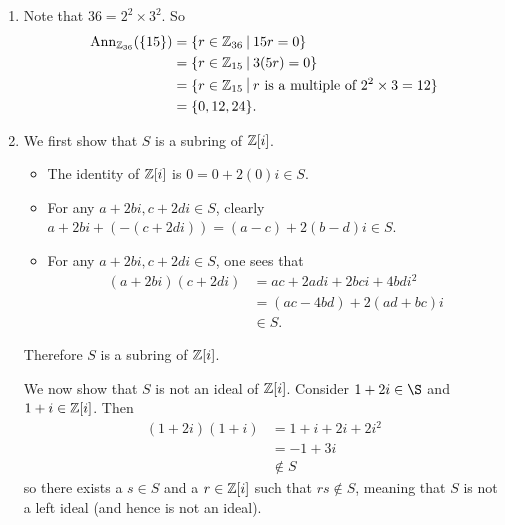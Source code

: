 \begin{enumerate}
    \item Note that $36 = 2^2 \times 3^2$. So
    \begin{align*}
        \Ann{\Z_{36}}{\{15\}} &= \{r \in \Z_{36} \vert 15r = 0\}\\
        &= \{r \in \Z_{15} \vert 3(5r) = 0\}\\
        &= \{r \in \Z_{15} \vert r \text{ is a multiple of }2^2\times3 = 12\}\\
        &= \{0,12,24\}.
    \end{align*}

    \item We first show that $S$ is a subring of $\mathbb{Z}[i]$.
    \begin{itemize}
        \item The identity of $\mathbb{Z}[i]$ is $0 = 0 + 2(0)i \in S$.
        \item For any $a+2bi, c+2di \in S$, clearly $a+2bi + (-(c + 2di)) = (a-c) + 2(b-d)i \in S$.
        \item For any $a+2bi, c+2di \in S$, one sees that
        \begin{align*}
            (a+2bi)(c+2di) &= ac + 2adi + 2bci + 4bdi^2\\
            &= (ac-4bd) + 2(ad+bc)i\\
            &\in S.
        \end{align*}
    \end{itemize}
    Therefore $S$ is a subring of $\mathbb{Z}[i]$.

    We now show that $S$ is not an ideal of $\mathbb{Z}[i]$. Consider $1+2i \in \S$ and $1+i \in \mathbb{Z}[i]$. Then
    \begin{align*}
        (1+2i)(1+i) &= 1+i+2i+2i^2\\
        &= -1 + 3i\\
        &\notin S
    \end{align*}
    so there exists a $s \in S$ and a $r \in \mathbb{Z}[i]$ such that $rs\notin S$, meaning that $S$ is not a left ideal (and hence is not an ideal).


\end{enumerate}
